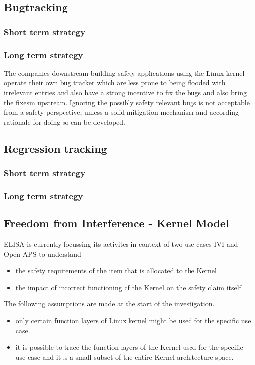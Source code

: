 \documentclass[12pt]{ElisaPaper}
\begin{document}
\subsection{Bugtracking}

\subsubsection{Short term strategy}

\subsubsection{Long term strategy}
The companies downstream building safety applications using the Linux kernel operate their own bug tracker which are less prone to being flooded with irrelevant entries and also have a strong incentive to fix the bugs and also bring the fixesm upstream. 
Ignoring the possibly safety relevant bugs is not acceptable from a safety perspective, unless a solid mitigation mechanism and according rationale for doing so can be developed.

\subsection{Regression tracking}
\subsubsection{Short term strategy}
\subsubsection{Long term strategy}  

\subsection{Freedom from Interference - Kernel Model}
ELISA is currently focussing its activites in context of two use cases IVI and Open APS to understand
\begin{itemize} 
	\item the safety requirements of the item that is allocated to the Kernel
	\item the impact of incorrect functioning of the Kernel on the safety claim itself 
\end{itemize}
The following assumptions are made at the start of the investigation.
\begin{itemize}
	\item 	only certain function layers of Linux kernel might be used for the specific use case. 
	\item 	it is possible to trace the function layers of the Kernel used for the specific use case and it is a small subset of the entire Kernel architecture space.
\end{itemize} 
\end{document}
